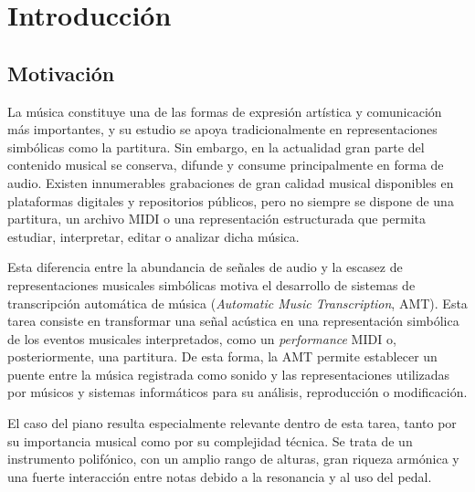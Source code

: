 \documentclass[11pt,spanish,listoffigures,listoftables]{tfgetsinf}
\begin{document}





\mainmatter






\chapter{Introducción}


\section{Motivación}

La música constituye una de las formas de expresión artística y comunicación más
importantes, y su estudio se apoya tradicionalmente en representaciones
simbólicas como la partitura. Sin embargo, en la actualidad gran parte del
contenido musical se conserva, difunde y consume principalmente en forma de
audio. Existen innumerables grabaciones de gran calidad musical disponibles en
plataformas digitales y repositorios públicos, pero
no siempre se dispone de una partitura, un archivo MIDI o una representación
estructurada que permita estudiar, interpretar, editar o analizar dicha música.

Esta diferencia entre la abundancia de señales de audio y la escasez de
representaciones musicales simbólicas motiva el desarrollo de sistemas de
transcripción automática de música (\textit{Automatic Music Transcription},
AMT). Esta tarea consiste en transformar una señal acústica en una representación
simbólica de los eventos musicales interpretados, como un \textit{performance}
MIDI o, posteriormente, una partitura. De esta forma, la AMT permite establecer
un puente entre la música registrada como sonido y las representaciones
utilizadas por músicos y sistemas informáticos para su análisis, reproducción o
modificación.

El caso del piano resulta especialmente relevante dentro de esta tarea, tanto por
su importancia musical como por su complejidad técnica. Se trata de un
instrumento polifónico, con un amplio rango de alturas, gran riqueza armónica y
una fuerte interacción entre notas debido a la resonancia y al uso del pedal.
\end{document}
